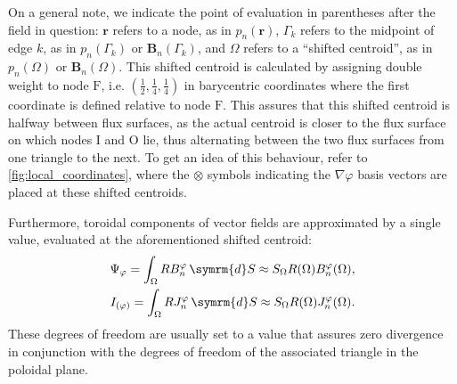 \documentclass[a4paper, twoside, 10pt, english]{article}
\numberwithin{equation}{section}
\let\temp\varrho
\let\varrho\rho
\let\rho\temp
\let\temp\vartheta
\let\vartheta\theta
\let\theta\temp
\let\temp\varphi
\let\varphi\phi
\let\phi\temp
\let\vec\symbf
\newcommand*\grad{\ensuremath{\nabla}}
\newcommand*\diff{\ensuremath{\symrm{d}}}  %
\newcommand*\vfs{\ensuremath{\textrm{F}}}  %
\newcommand*\vinw{\ensuremath{\textrm{I}}}  %
\newcommand*\vout{\ensuremath{\textrm{O}}}  %
\begin{document}
On a general note, we indicate the point of evaluation in parentheses after the field in question: $\vec{r}$ refers to a node, as in $p_{n} (\vec{r})$, $\Gamma_{k}$ refers to the midpoint of edge $k$, as in $p_{n} (\Gamma_{k})$ or $\vec{B}_{n} (\Gamma_{k})$, and $\Omega$ refers to a \enquote{shifted centroid}, as in $p_{n} (\Omega)$ or $\vec{B}_{n} (\Omega)$. This shifted centroid is calculated by assigning double weight to node $\vfs$, i.e. $\left ( \frac{1}{2}, \frac{1}{4}, \frac{1}{4} \right )$ in barycentric coordinates where the first coordinate is defined relative to node $\vfs$. This assures that this shifted centroid is halfway between flux surfaces, as the actual centroid is closer to the flux surface on which nodes $\vinw$ and $\vout$ lie, thus alternating between the two flux surfaces from one triangle to the next. To get an idea of this behaviour, refer to \cref{fig:local_coordinates}, where the $\otimes$ symbols indicating the $\grad \phi$ basis vectors are placed at these shifted centroids.

Furthermore, toroidal components of vector fields are approximated by a single value, evaluated at the aforementioned shifted centroid:
\begin{gather}
  \Psi_{\phi} = \int_{\Omega} R B_{n}^{\phi} \, \diff S \approx S_{\Omega} R (\Omega) B_{n}^{\phi} (\Omega), \label{eq:Psi_phi} \\
  I_{(\phi)} = \int_{\Omega} R J_{n}^{\phi} \, \diff S \approx S_{\Omega} R (\Omega) J_{n}^{\phi} (\Omega). \label{eq:I_phi}
\end{gather}
These degrees of freedom are usually set to a value that assures zero divergence in conjunction with the degrees of freedom of the associated triangle in the poloidal plane.
\end{document}
